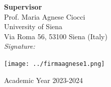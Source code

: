 \begin{titlepage}
\begin{minipage}{0.5\textwidth}
    \textbf{Supervisor}\\
    Prof. Maria Agnese Ciocci\\
    University of Siena\\
    Via Roma 56, 53100 Siena (Italy)\\

    \hspace{4cm} \textit{Signature:}\\
    \end{minipage}
    \begin{minipage}{0.4\textwidth}
        \vspace{2cm}
        \hspace{-2.5cm}
        \texttt{[image: ../firmaagnese1.png]}
    \end{minipage}


\vfill
\begin{center}
    \large Academic Year 2023-2024
    \end{center}



\end{titlepage}
\restoregeometry
